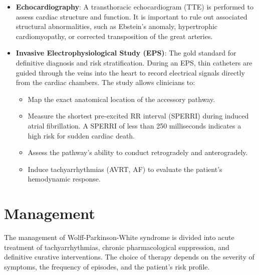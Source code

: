 \begin{itemize}
  \item \textbf{Echocardiography}: A transthoracic echocardiogram (TTE) is performed to assess cardiac structure and function. It is important to rule out associated structural abnormalities, such as Ebstein's anomaly, hypertrophic cardiomyopathy, or corrected transposition of the great arteries.
  \item \textbf{Invasive Electrophysiological Study (EPS)}: The gold standard for definitive diagnosis and risk stratification. During an EPS, thin catheters are guided through the veins into the heart to record electrical signals directly from the cardiac chambers. The study allows clinicians to:
    \begin{itemize}
      \item Map the exact anatomical location of the accessory pathway.
      \item Measure the shortest pre-excited RR interval (SPERRI) during induced atrial fibrillation. A SPERRI of less than 250 milliseconds indicates a high risk for sudden cardiac death.
      \item Assess the pathway's ability to conduct retrogradely and anterogradely.
      \item Induce tachyarrhythmias (AVRT, AF) to evaluate the patient's hemodynamic response.
    \end{itemize}
\end{itemize}

\section*{Management}
The management of Wolff-Parkinson-White syndrome is divided into acute treatment of tachyarrhythmias, chronic pharmacological suppression, and definitive curative interventions. The choice of therapy depends on the severity of symptoms, the frequency of episodes, and the patient's risk profile.

